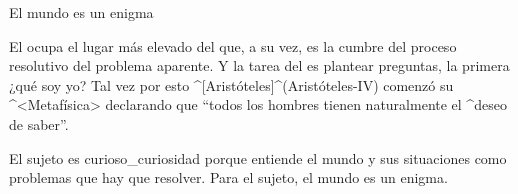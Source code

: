 \Section El mundo es un enigma

El {\inquisidor} ocupa el lugar más elevado del {\sujeto} que, a su vez,
es la cumbre del proceso resolutivo del problema aparente. Y la tarea
del {\inquisidor} es plantear preguntas, la primera ¿qué soy yo? Tal vez
por esto ^[Aristóteles]^(Aristóteles-IV) comenzó su ^<Metafísica>
declarando que ``todos los hombres tienen naturalmente el ^{deseo} de
saber''.

El sujeto es curioso_{curiosidad} porque entiende el mundo y sus
situaciones como problemas que hay que resolver. Para el sujeto, el
mundo es un enigma.


\endinput
